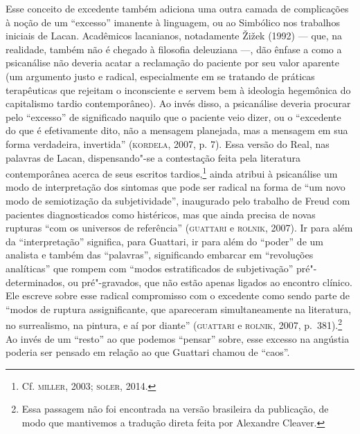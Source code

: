 Esse conceito de excedente também adiciona uma outra camada de
complicações à noção de um ``excesso'' imanente à linguagem, ou ao
Simbólico nos trabalhos iniciais de Lacan. Acadêmicos lacanianos,
notadamente Žižek (1992) --- que, na realidade, também não é chegado à
filosofia deleuziana ---, dão ênfase a como a psicanálise não deveria
acatar a reclamação do paciente por seu valor aparente (um argumento
justo e radical, especialmente em se tratando de práticas terapêuticas
que rejeitam o inconsciente e servem bem à ideologia hegemônica do
capitalismo tardio contemporâneo). Ao invés disso, a psicanálise deveria
procurar pelo ``excesso'' de significado naquilo que o paciente veio
dizer, ou o ``excedente do que é efetivamente dito, não a mensagem
planejada, mas a mensagem em sua forma verdadeira, invertida'' (\textsc{kordela},
2007, p. 7). Essa versão do Real, nas palavras de Lacan, dispensando"-se a
contestação feita pela literatura contemporânea acerca de seus escritos
tardios,\footnote{Cf. \textsc{miller}, 2003; \textsc{soler}, 2014.} ainda atribui à psicanálise um
modo de interpretação dos sintomas que pode ser radical na forma de ``um
novo modo de semiotização da subjetividade'', inaugurado pelo trabalho
de Freud com pacientes diagnosticados como histéricos, mas que ainda
precisa de novas rupturas ``com os universos de referência'' (\textsc{guattari} e
\textsc{rolnik}, 2007). Ir para além da ``interpretação'' significa, para
Guattari, ir para além do ``poder'' de um analista e também das
``palavras'', significando embarcar em ``revoluções analíticas'' que
rompem com ``modos estratificados de subjetivação'' pré"-determinados, ou
pré"-gravados, que não estão apenas ligados ao encontro clínico. Ele
escreve sobre esse radical compromisso com o excedente como sendo parte
de ``modos de ruptura assignificante, que apareceram simultaneamente na
literatura, no surrealismo, na pintura, e aí por diante'' (\textsc{guattari} e
\textsc{rolnik}, 2007, p.~381).\footnote{Essa passagem não foi encontrada na versão
  brasileira da publicação, de modo que mantivemos a tradução direta
  feita por Alexandre Cleaver.} Ao invés de um ``resto'' ao que podemos
``pensar'' sobre, esse excesso na angústia poderia ser pensado em
relação ao que Guattari chamou de ``caos''.

